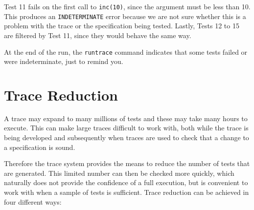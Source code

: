 \documentclass{overturerepchap}
\begin{document}
Test 11 fails on the first call to \texttt{inc(10)}, since the argument must be
less than 10. This produces an \texttt{INDETERMINATE} error because we are not
sure whether this is a problem with the trace or the specification being tested.
Lastly, Tests 12 to 15 are filtered by Test 11, since they would behave the same
way.

At the end of the run, the \texttt{runtrace} command indicates that some tests
failed or were indeterminate, just to remind you.

\section{Trace Reduction}

A trace may expand to many millions of tests and these may take many hours to
execute. This can make large traces difficult to work with, both while the trace
is being developed and subsequently when traces are used to check that a change
to a specification is sound.

Therefore the trace system provides the means to reduce the number of tests that
are generated. This limited number can then be checked more quickly, which
naturally does not provide the confidence of a full execution, but is convenient
to work with when a sample of tests is sufficient. Trace reduction can be
achieved in four different ways:
\end{document}

